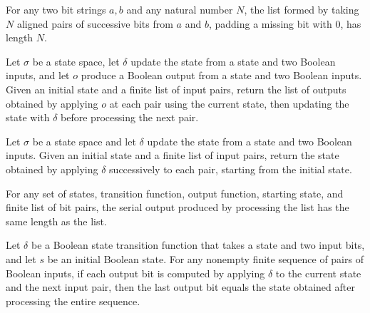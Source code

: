 \begin{theorem}
\label{Complexity.BinArith.length_padZip}
\leanok
{}
For any two bit strings $a,b$ and any natural number $N$, the list formed by taking $N$
aligned pairs of successive bits from $a$ and $b$, padding a missing bit with $0$, has
length $N$.
\end{theorem}

\begin{definition}
\label{Complexity.BinArith.serialOut}
\leanok
Let $\sigma$ be a state space, let $\delta$ update the state from a state and two
Boolean inputs, and let $o$ produce a Boolean output from a state and two Boolean
inputs. Given an initial state and a finite list of input pairs, return the list of
outputs obtained by applying $o$ at each pair using the current state, then updating the
state with $\delta$ before processing the next pair.
\end{definition}

\begin{definition}
\label{Complexity.BinArith.serialState}
\leanok
Let $\sigma$ be a state space and let $\delta$ update the state from a state and two
Boolean inputs. Given an initial state and a finite list of input pairs, return the
state obtained by applying $\delta$ successively to each pair, starting from the initial
state.
\end{definition}

\begin{theorem}
\label{Complexity.BinArith.length_serialOut}
\leanok
{}
For any set of states, transition function, output function, starting state, and finite
list of bit pairs, the serial output produced by processing the list has the same length
as the list.
\end{theorem}

\begin{theorem}
\label{Complexity.BinArith.getLastD_serialOut_self}
\leanok
{}
Let $\delta$ be a Boolean state transition function that takes a state and two input bits,
and let $s$ be an initial Boolean state. For any nonempty finite sequence of pairs of
Boolean inputs, if each output bit is computed by applying $\delta$ to the current state and
the next input pair, then the last output bit equals the state obtained after processing
the entire sequence.
\end{theorem}

